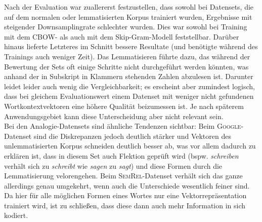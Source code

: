   Nach der Evaluation war zuallererst festzustellen, dass sowohl bei Datensets, die auf dem normalen oder lemmatisierten Korpus
  trainiert wurden, Ergebnisse mit steigender Downsamplingrate schlechter wurden. Dies war sowohl bei Training mit dem CBOW- als
  auch mit dem Skip-Gram-Modell feststellbar. Darüber hinaus lieferte Letzteres im Schnitt bessere Resultate (und benötigte
  während des Trainings auch weniger Zeit). Das Lemmatisieren führte dazu, das während der Bewertung der Sets oft einige
  Schritte nicht durchgeführt werden könnten, was anhand der in Subskript in Klammern stehenden Zahlen abzulesen ist.
  Darunter leidet leider auch wenig die Vergleichbarkeit; es erscheint aber zumindest logisch, dass bei gleichem Evaluationswert
  einem Datenset mit weniger nicht gefundenen Wortkontextvektoren eine höhere Qualität beizumessen ist. Je nach
  späterem Anwendungsgebiet kann diese Unterscheidung aber nicht relevant sein.\\
  Bei den Analogie-Datensets sind ähnliche Tendenzen sichtbar: Beim \textsc{Google}-Datenset sind die Diskrepanzen jedoch
  deutlich stärker und Vektoren des unlemmatisierten Korpus schneiden deutlich besser ab, was vor allem dadurch
  zu erklären ist, dass in diesem Set auch Flektion geprüft wird (bspw. \emph{schreiben} verhält sich zu \emph{schreibt} wie
   \emph{sagen} zu \emph{sagt}) und diese Formen durch die Lemmatisierung velorengehen. Beim \textsc{SemRel}-Datenset
  verhält sich das ganze allerdings genau umgekehrt, wenn auch die Unterschiede wesentlich feiner sind. Da hier für alle
  möglichen Formen eines Wortes nur eine Vektorrepräsentation trainiert wird, ist zu schließen, dass diese dann auch
  mehr Information in sich kodiert.\\

